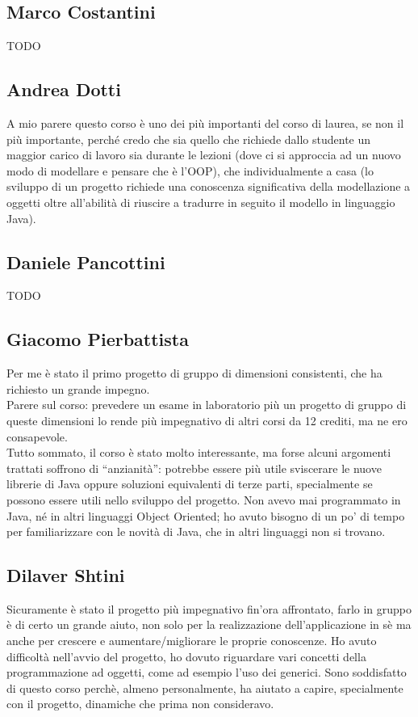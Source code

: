 \documentclass[a4paper,12pt]{report}
\begin{document}
\subsection*{Marco Costantini}
{TODO}

\subsection*{Andrea Dotti}
A mio parere questo corso è uno dei più importanti del corso di laurea, se non il più importante, perché credo che sia quello che richiede dallo studente un maggior carico di lavoro sia durante le lezioni (dove ci si approccia ad un nuovo modo di modellare e pensare che è l'OOP), che individualmente a casa (lo sviluppo di un progetto richiede una conoscenza significativa della modellazione a oggetti oltre all'abilità di riuscire a tradurre in seguito il modello in linguaggio Java).

\subsection*{Daniele Pancottini}
{TODO}

\subsection*{Giacomo Pierbattista}
Per me è stato il primo progetto di gruppo di dimensioni consistenti, che ha richiesto un grande impegno. 
\\Parere sul corso: prevedere un esame in laboratorio più un progetto di gruppo di queste dimensioni lo rende più
impegnativo di altri corsi da 12 crediti, ma ne ero consapevole. 
\\Tutto sommato, il corso è stato molto interessante, ma forse alcuni argomenti trattati soffrono di ``anzianità'':
potrebbe essere più utile sviscerare le nuove librerie di Java oppure soluzioni equivalenti di terze parti,
specialmente se possono essere utili nello sviluppo del progetto.
Non avevo mai programmato in Java, né in altri linguaggi Object Oriented; ho avuto bisogno 
di un po' di tempo per familiarizzare con le novità di Java, che in altri linguaggi non si trovano.


\subsection*{Dilaver Shtini}
Sicuramente è stato il progetto più impegnativo fin'ora affrontato, farlo in gruppo è di certo un grande aiuto,
non solo per la realizzazione dell'applicazione in sè ma anche per crescere e aumentare/migliorare le proprie conoscenze.
Ho avuto difficoltà nell'avvio del progetto, ho dovuto riguardare vari concetti della programmazione ad oggetti,
come  ad esempio l'uso dei generici. Sono soddisfatto di questo corso perchè, almeno personalmente, ha aiutato a capire,
specialmente con il progetto, dinamiche che prima non consideravo.
\end{document}
